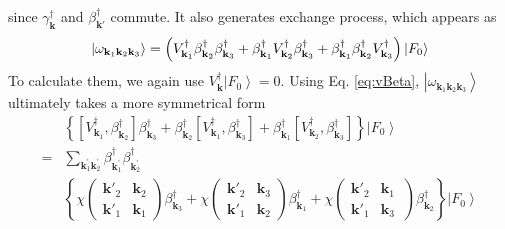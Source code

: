 \documentclass[aps,prb,superscriptaddress,showpacs,reprint,lengthcheck]{revtex4-1}
\newcommand{\vk}{\ensuremath{\mathbf{k}}}
\begin{document}
since $\gamma^{\dagger}_{\mathbf{k}}$ and $\beta^{\dagger}_{\mathbf{k}'}$ commute.  It also generates exchange process, which appears as 
\begin{equation}
\left|\omega_{\mathbf{k} _1\mathbf{k} _2\mathbf{k} _3}\right> =\left(V^{\dagger}_{\mathbf{k} _1}\beta^{\dagger}_{\mathbf{k}
_2}\beta^{\dagger}_{\mathbf{k} _3}+\beta^{\dagger}_{\mathbf{k}
_1}V^{\dagger}_{\mathbf{k} _2}\beta^{\dagger}_{\mathbf{k} _3}+\beta^{%
\dagger}_{\mathbf{k} _1}\beta^{\dagger}_{\mathbf{k} _2}V^{\dagger}_{\mathbf{k%
} _3}\right) \left|F_0\right>  
\end{equation}
To calculate them, we again use $V^{\dagger}_\vk\left|F_0\right>  =0$. Using
Eq. \eqref{eq:vBeta}, $\left|\omega_{\mathbf{k} _1\mathbf{k} _2\mathbf{k} _3}\right>$ ultimately takes a more symmetrical form 
\begin{equation}  \label{eq:vThree2}
\begin{split}
&\left\{\left[V^{\dagger}_{\mathbf{k} _1},\beta^{\dagger}_{\mathbf{k} _2}%
\right]  \beta^{\dagger}_{\mathbf{k} _3}+\beta^{\dagger}_{\mathbf{k} _2}%
\left[V^{\dagger}_{\mathbf{k} _1},\beta^{\dagger}_{\mathbf{k} _3}\right] 
+\beta^{\dagger}_{\mathbf{k} _1}\left[V^{\dagger}_{\mathbf{k}
_2},\beta^{\dagger}_{\mathbf{k} _3}\right]  \right\} \left|F_0\right>   \\
=&\sum_{\vk^{\prime}_1\mathbf{k} ^{\prime}_2}\beta^{\dagger}_{\mathbf{k}
^{\prime}_1}\beta^{\dagger}_{\mathbf{k} ^{\prime}_2} \\
&\left\{\chi\left(\begin{smallmatrix}\vk'_2&\vk_2\\\vk'_1&\vk_1%
\end{smallmatrix}\right)  \beta^{\dagger}_{\mathbf{k} _3}+\chi\left(%
\begin{smallmatrix}\vk'_2&\vk_3\\\vk'_1&\vk_2\end{smallmatrix}\right) 
\beta^{\dagger}_{\mathbf{k} _1}+\chi\left(\begin{smallmatrix}\vk'_2&\vk_1\
\\\vk'_1&\vk_3\end{smallmatrix}\right)  \beta^{\dagger}_{\mathbf{k}
_2}\right\} \left|F_0\right>  
\end{split}%
\end{equation}
\end{document}
